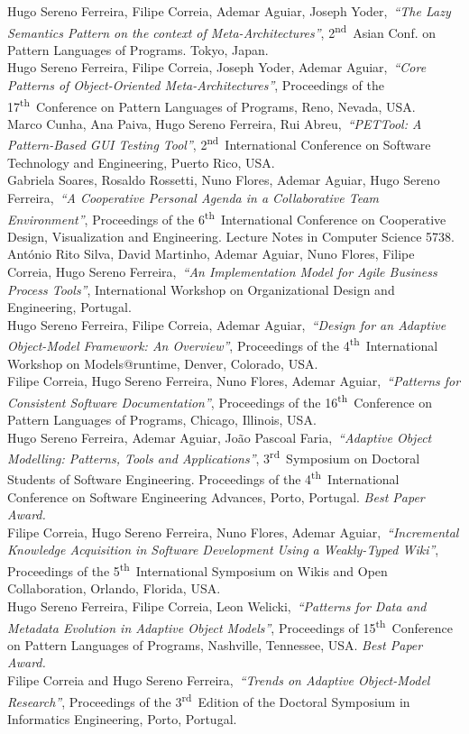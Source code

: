 \documentclass[9pt, a4paper, pstricks]{article}
\newcommand{\current}{{\hspace{-0.97em}\color{feup}$\star$}~}
\newcommand{\years}[1]{\marginnote{\small #1}}
\newcommand{\nth}{\textsuperscript{th}~}
\newcommand{\nd}{\textsuperscript{nd}~}
\newcommand{\rd}{\textsuperscript{rd}~}
\newcommand{\publication}[4]{\years{#1}#2,~\emph{``#3''}, #4}
\newcommand{\awardedpub}[4]{\years{\current~#1}#2,~\emph{``#3''}, #4 {\color{feup} \emph{Best Paper Award.}}}
\begin{document}
{\publication{2011}{Hugo Sereno Ferreira, Filipe Correia, Ademar Aguiar, Joseph Yoder}{The Lazy Semantics Pattern on the context of Meta-Architectures}{2\nd Asian Conf. on Pattern Languages of Programs. Tokyo, Japan.}\\
\publication{2010}{Hugo Sereno Ferreira, Filipe Correia, Joseph Yoder, Ademar Aguiar}{Core Patterns of Object-Oriented Meta-Architectures}{Proceedings of the 17\nth Conference on Pattern Languages of Programs, Reno, Nevada, USA.}\\
\publication{2010}{Marco Cunha, Ana Paiva, Hugo Sereno Ferreira, Rui Abreu}{PETTool: A Pattern-Based GUI Testing Tool}{2\nd International Conference on Software Technology and Engineering, Puerto Rico, USA.}\\
\publication{2009}{Gabriela Soares, Rosaldo Rossetti, Nuno Flores, Ademar Aguiar, Hugo Sereno Ferreira}{A Cooperative Personal Agenda in a Collaborative Team Environment}{Proceedings of the 6\nth International Conference on Cooperative Design, Visualization and Engineering. Lecture Notes in Computer Science 5738.}\\
\publication{2009}{António Rito Silva, David Martinho, Ademar Aguiar, Nuno Flores, Filipe Correia, Hugo Sereno Ferreira}{An Implementation Model for Agile Business Process Tools}{International Workshop on Organizational Design and Engineering, Portugal.}\\
\publication{2009}{Hugo Sereno Ferreira, Filipe Correia, Ademar Aguiar}{Design for an Adaptive Object-Model Framework: An Overview}{Proceedings of the 4\nth International Workshop on Models@runtime, Denver, Colorado, USA.}\\
\publication{2009}{Filipe Correia, Hugo Sereno Ferreira, Nuno Flores, Ademar Aguiar}{Patterns for Consistent Software Documentation}{Proceedings of the 16\nth Conference on Pattern Languages of Programs, Chicago, Illinois, USA.}\\
\awardedpub{2009}{Hugo Sereno Ferreira, Ademar Aguiar, João Pascoal Faria}{Adaptive Object Modelling: Patterns, Tools and Applications}{3\rd Symposium on Doctoral Students of Software Engineering. Proceedings of the 4\nth International Conference on Software Engineering Advances, Porto, Portugal.}\\
\publication{2009}{Filipe Correia, Hugo Sereno Ferreira, Nuno Flores, Ademar Aguiar}{Incremental Knowledge Acquisition in Software Development Using a Weakly-Typed Wiki}{Proceedings of the 5\nth International Symposium on Wikis and Open Collaboration, Orlando, Florida, USA.}\\
\awardedpub{2008}{Hugo Sereno Ferreira, Filipe Correia, Leon Welicki}{Patterns for Data and Metadata Evolution in Adaptive Object Models}{Proceedings of 15\nth Conference on Pattern Languages of Programs, Nashville, Tennessee, USA.}\\
\publication{2008}{Filipe Correia and Hugo Sereno Ferreira}{Trends on Adaptive Object-Model Research}{Proceedings of the 3\rd Edition of the Doctoral Symposium in Informatics Engineering, Porto, Portugal.}

}
\end{document}
